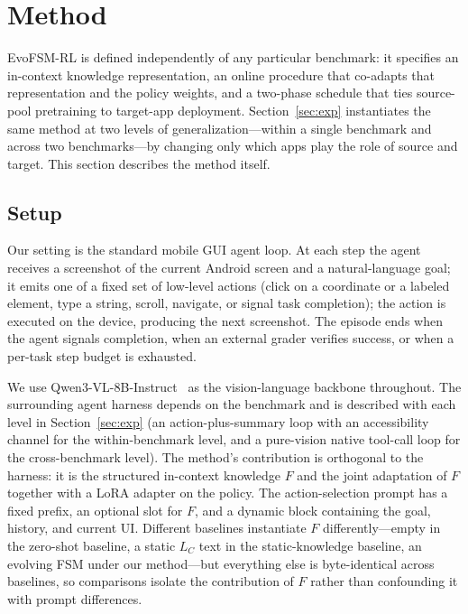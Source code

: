 \section{Method}
\label{sec:method}

EvoFSM-RL is defined independently of any particular benchmark: it specifies an
in-context knowledge representation, an online procedure that co-adapts that
representation and the policy weights, and a two-phase schedule that ties
source-pool pretraining to target-app deployment. Section~\ref{sec:exp}
instantiates the same method at two levels of generalization---within a single
benchmark and across two benchmarks---by changing only which apps play the role
of source and target. This section describes the method itself.

\subsection{Setup}
\label{sec:method-setup}

Our setting is the standard mobile GUI agent loop. At each step the agent
receives a screenshot of the current Android screen and a natural-language goal;
it emits one of a fixed set of low-level actions (click on a coordinate or a
labeled element, type a string, scroll, navigate, or signal task completion);
the action is executed on the device, producing the next screenshot. The episode
ends when the agent signals completion, when an external grader verifies
success, or when a per-task step budget is exhausted.

We use Qwen3-VL-8B-Instruct~\citep{qwen3vl2025} as the vision-language backbone
throughout. The surrounding agent harness depends on the benchmark and is
described with each level in Section~\ref{sec:exp} (an action-plus-summary loop
with an accessibility channel for the within-benchmark level, and a pure-vision
native tool-call loop for the cross-benchmark level). The method's contribution
is orthogonal to the harness: it is the structured in-context knowledge $F$ and
the joint adaptation of $F$ together with a LoRA adapter on the policy. The
action-selection prompt has a fixed prefix, an optional slot for $F$, and a
dynamic block containing the goal, history, and current UI. Different baselines
instantiate $F$ differently---empty in the zero-shot baseline, a static $L_C$
text in the static-knowledge baseline, an evolving FSM under our method---but
everything else is byte-identical across baselines, so comparisons isolate the
contribution of $F$ rather than confounding it with prompt differences.

